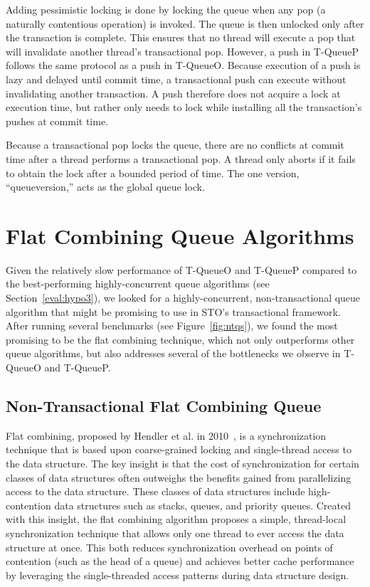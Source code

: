 Adding pessimistic locking is done by locking the queue when any pop (a naturally contentious operation) is invoked. The queue is then unlocked only after the transaction is complete. This ensures that no thread will execute a pop that will invalidate another thread's transactional pop. However, a push in T-QueueP follows the same protocol as a push in T-QueueO. Because execution of a push is lazy and delayed until commit time, a transactional push can execute without invalidating another transaction. A push therefore does not acquire a lock at execution time, but rather only needs to lock while installing all the transaction's pushes at commit time. 

Because a transactional pop locks the queue, there are no conflicts at commit time after a thread performs a transactional pop. A thread only aborts if it fails to obtain the lock after a bounded period of time. The one version, ``queueversion,'' acts as the global queue lock. 


\section{Flat Combining Queue Algorithms}
Given the relatively slow performance of T-QueueO and T-QueueP compared to the best-performing highly-concurrent queue algorithms (see Section~\ref{eval:hypo3}), we looked for a highly-concurrent, non-transactional queue algorithm that might be promising to use in STO's transactional framework. After running several benchmarks (see Figure~\ref{fig:ntqs}), we found the most promising to be the flat combining technique, which not only outperforms other queue algorithms, but also addresses several of the bottlenecks we observe in T-QueueO and T-QueueP.

\subsection{Non-Transactional Flat Combining Queue}
\label{fcqueuent}

Flat combining, proposed by Hendler et al. in 2010~\cite{flatcombining}, is a synchronization technique that is based upon coarse-grained locking and single-thread access to the data structure. The key insight is that the cost of synchronization for certain classes of data structures often outweighs the benefits gained from parallelizing access to the data structure. These classes of data structures include high-contention data structures such as stacks, queues, and priority queues. Created with this insight, the flat combining algorithm proposes a simple, thread-local synchronization technique that allows only one thread to ever access the data structure at once. This both reduces synchronization overhead on points of contention (such as the head of a queue) and achieves better cache performance by leveraging the single-threaded access patterns during data structure design.

